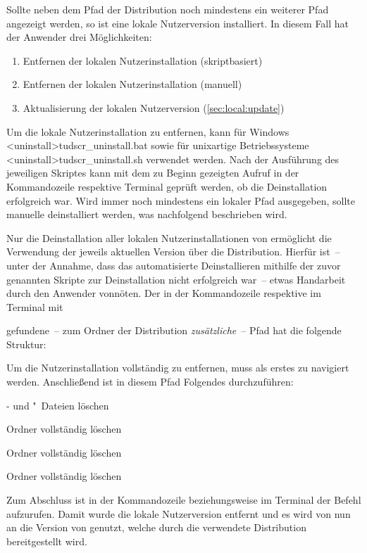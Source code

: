 Sollte neben dem Pfad der Distribution noch mindestens ein weiterer Pfad 
angezeigt werden, so ist eine lokale Nutzerversion installiert. In 
diesem Fall hat der Anwender drei Möglichkeiten:
%
\begin{enumerate}
\item Entfernen der lokalen Nutzerinstallation (skriptbasiert)
\item Entfernen der lokalen Nutzerinstallation (manuell)
\item Aktualisierung der lokalen Nutzerversion (\autoref{sec:local:update})
\end{enumerate}
%
Um die lokale Nutzerinstallation zu entfernen, kann für Windows
\GitHubDownload*<uninstall>{tudscr_uninstall.bat} sowie für unixartige 
Betriebssysteme \GitHubDownload*<uninstall>{tudscr_uninstall.sh} verwendet 
werden. Nach der Ausführung des jeweiligen Skriptes kann mit dem zu Beginn 
gezeigten Aufruf in der Kommandozeile respektive Terminal geprüft werden, ob 
die Deinstallation erfolgreich war. Wird immer noch mindestens ein lokaler Pfad 
ausgegeben, sollte \TUDScript manuelle deinstalliert werden, was nachfolgend 
beschrieben wird.

Nur die Deinstallation aller lokalen Nutzerinstallationen von \TUDScript 
ermöglicht die Verwendung der jeweils aktuellen Version über die Distribution. 
Hierfür ist~-- unter der Annahme, dass das automatisierte Deinstallieren 
mithilfe der zuvor genannten Skripte zur Deinstallation nicht erfolgreich 
war~-- etwas Handarbeit durch den Anwender vonnöten. Der in der Kommandozeile 
respektive im Terminal mit
%
\begin{quoting}
\end{quoting}
%
gefundene~-- zum Ordner der Distribution \emph{zusätzliche}~-- Pfad hat die 
folgende Struktur:
%
\begin{quoting}
\end{quoting}
%
Um die Nutzerinstallation vollständig zu entfernen, muss als erstes zu 
 navigiert werden. Anschließend ist in diesem 
Pfad Folgendes durchzuführen:
%
\settowidth{}%
\begin{description}[labelwidth=\tudscrdim,labelsep=1em]
\item[\Path{tex/latex/tudscr/}]- und "~Dateien löschen
\item[\Path{tex/latex/tudscr/}]Ordner  vollständig löschen
\item[\Path{doc/latex/}] Ordner  vollständig löschen
\item[\Path{source/latex/}] Ordner  vollständig löschen
\end{description}
%
Zum Abschluss ist in der Kommandozeile beziehungsweise im Terminal der Befehl 
 aufzurufen. Damit wurde die lokale Nutzerversion entfernt und es 
wird von nun an die Version von \TUDScript genutzt, welche durch die verwendete 
Distribution bereitgestellt wird.



